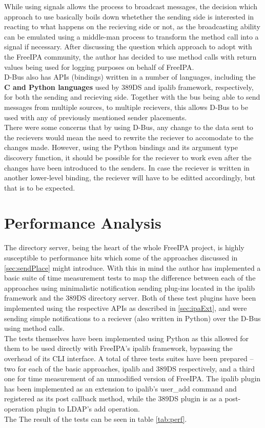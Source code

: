While using signals allows the process to broadcast messages, the decision which approach to use basically boils down whetether the sending side is interested in reacting to what happens on the recieving side or not,
as the broadcasting ability can be emulated using a middle-man process to transform the method call into a signal if necessary. After discussing the question which approach to adopt with the FreeIPA community, the author has decided to use
method calls with return values being used for logging purposes on behalf of FreeIPA. \\
D-Bus also has APIs (bindings) written in a number of languages, including the \textbf{C and Python languages} used by 389DS and ipalib framework, respectively, for both the sending and recieving side.
Together with the bus being able to send messages from multiple sources, to multiple recievers, this allows D-Bus to be used with any of previously mentioned sender placements. \\
There were some concerns that by using D-Bus, any change to the data sent to the recievers would mean the need to rewrite the reciever to accomodate to the changes made.
However, using the Python bindings and its argument type discovery function, it should be possible for the reciever to work even after the changes have been introduced to the senders.
In case the reciever is written in another lower-level binding, the reciever will have to be editted accordingly, but that is to be expected. \\

\section{Performance Analysis}
The directory server, being the heart of the whole FreeIPA project, is highly susceptible to performance hits which some of the approaches discussed in \ref{sec:sendPlace} might introduce.
With this in mind the author has implemented a basic suite of time measurement tests to map the difference between each of the approaches using minimalistic notification sending plug-ins located in the ipalib framework and the 389DS directory server.
Both of these test plugins have been implemented using the respective APIs as described in \ref{sec:ipaExt}, and were sending simple notifications to a reciever (also written in Python) over the D-Bus using method calls. \\
The tests themselves have been implemented using Python as this allowed for them to be used directly with FreeIPA's ipalib framework, bypassing the overhead of its CLI interface. A total of three tests suites have been prepared --
two for each of the basic approaches, ipalib and 389DS respectively, and a third one for time measurement of an unmodified version of FreeIPA. The ipalib plugin has been implemented as an extension to ipalib's user\_add command and registered as its post callback method,
while the 389DS plugin is as a post-operation plugin to LDAP's add operation.\\
The 
The result of the tests can be seen in table \ref{tab:perf}. \\

